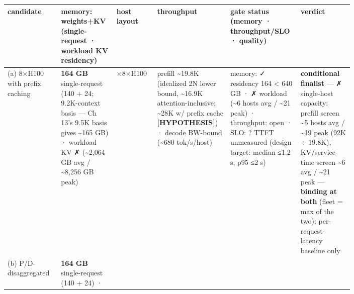 \nopagebreak[4]
\begin{longtable}[]{@{}
  >{\raggedright\arraybackslash}p{0.1405\linewidth}
  >{\raggedright\arraybackslash}p{0.1124\linewidth}
  >{\raggedright\arraybackslash}p{0.1030\linewidth}
  >{\raggedright\arraybackslash}p{0.1779\linewidth}
  >{\raggedright\arraybackslash}p{0.1124\linewidth}
  >{\raggedright\arraybackslash}p{0.1498\linewidth}@{}}
\toprule\noalign{}
\begin{minipage}[b]{\linewidth}\raggedright
candidate
\end{minipage} & \begin{minipage}[b]{\linewidth}\raggedright
memory: weights+KV (single-request · workload KV residency)
\end{minipage} & \begin{minipage}[b]{\linewidth}\raggedright
host layout
\end{minipage} & \begin{minipage}[b]{\linewidth}\raggedright
throughput
\end{minipage} & \begin{minipage}[b]{\linewidth}\raggedright
gate status (memory · throughput/SLO · quality)
\end{minipage} & \begin{minipage}[b]{\linewidth}\raggedright
verdict
\end{minipage} \\
\midrule\noalign{}
\endhead
\bottomrule\noalign{}
\endlastfoot
(a) 8×H100 with prefix caching & \textbf{164 GB} single-request (140 +
24; 9.2K-context basis --- Ch 13's 9.5K basis gives \textasciitilde165
GB) · workload KV ✗ (\textasciitilde2,064 GB avg / \textasciitilde8,256
GB peak) & 1 ×8×H100 & prefill \textasciitilde19.8K (idealized 2N lower
bound, \textasciitilde16.9K attention-inclusive; \textasciitilde28K w/
prefix cache \textbf{\mbox{{[}HYPOTHESIS{]}}}) · decode BW-bound
(\textasciitilde680 tok/s/host) & memory: ✓ residency 164 \textless{}
640 GB · ✗ workload (\textasciitilde6 hosts avg / \textasciitilde21
peak) · throughput: open · SLO: ? TTFT unmeasured (design target: median
≤1.2 s, p95 ≤2 s) & \textbf{conditional finalist} --- ✗ single-host
capacity: prefill screen \textasciitilde5 hosts avg / \textasciitilde19
peak (92K ÷ 19.8K), KV/service-time screen \textasciitilde6 avg /
\textasciitilde21 peak --- \textbf{binding at both} (fleet = max of the
two); per-request-latency baseline only \\
\noalign{\label{tab:12.1}}
(b) P/D-disaggregated & \textbf{164 GB} single-request (140 + 24) ·

\end{longtable}
